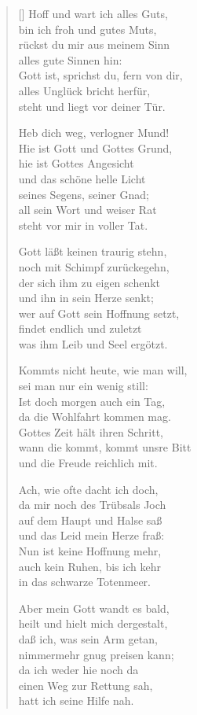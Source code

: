 \begin{multicols}{2}
\begin{verse}[\versewidth]
 Hoff und wart ich alles Guts,\\
bin ich froh und gutes Muts,\\
rückst du mir aus meinem Sinn\\
alles gute Sinnen hin:\\
Gott ist, sprichst du, fern von dir,\\
alles Unglück bricht herfür,\\
steht und liegt vor deiner Tür.

 Heb dich weg, verlogner Mund!\\
Hie ist Gott und Gottes Grund,\\
hie ist Gottes Angesicht\\
und das schöne helle Licht\\
seines Segens, seiner Gnad;\\
all sein Wort und weiser Rat\\
steht vor mir in voller Tat.

 Gott läßt keinen traurig stehn,\\
noch mit Schimpf zurückegehn,\\
der sich ihm zu eigen schenkt\\
und ihn in sein Herze senkt;\\
wer auf Gott sein Hoffnung setzt,\\
findet endlich und zuletzt\\
was ihm Leib und Seel ergötzt.

 Kommts nicht heute, wie man will,\\
sei man nur ein wenig still:\\
Ist doch morgen auch ein Tag,\\
da die Wohlfahrt kommen mag.\\
Gottes Zeit hält ihren Schritt,\\
wann die kommt, kommt unsre Bitt\\
und die Freude reichlich mit.

 Ach, wie ofte dacht ich doch,\\
da mir noch des Trübsals Joch\\
auf dem Haupt und Halse saß\\
und das Leid mein Herze fraß:\\
Nun ist keine Hoffnung mehr,\\
auch kein Ruhen, bis ich kehr\\
in das schwarze Totenmeer.

 Aber mein Gott wandt es bald,\\
heilt und hielt mich dergestalt,\\
daß ich, was sein Arm getan,\\
nimmermehr gnug preisen kann;\\
da ich weder hie noch da\\
einen Weg zur Rettung sah,\\
hatt ich seine Hilfe nah.


\end{verse}
\end{multicols}
